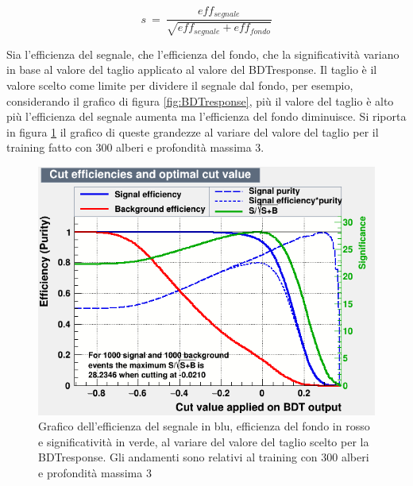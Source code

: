     \begin{equation}
        s \ = \ \frac{eff_{segnale}}{\sqrt{eff_{segnale} + eff_{fondo}}}
    \end{equation}{}

Sia l'efficienza del segnale, che l'efficienza del fondo, che la significatività variano in base al valore del taglio applicato al valore del BDTresponse. Il taglio è il valore scelto come limite per dividere il segnale dal fondo, per esempio, considerando il grafico di figura \ref{fig:BDTresponse}, più il valore del taglio è alto più l'efficienza del segnale aumenta ma l'efficienza del fondo diminuisce. Si riporta in figura \ref{fig:effBDT} il grafico di queste grandezze al variare del valore del taglio per il training fatto con 300 alberi e profondità massima 3.
\\

    \begin{figure}[htbp] 
        \centering
        \includegraphics[width=0.7\linewidth]{training&testing/effBDT.png}
        \caption{Grafico dell'efficienza del segnale in blu, efficienza del fondo in rosso e significatività in verde, al variare del valore del taglio scelto per la BDTresponse. Gli andamenti sono relativi al training con 300 alberi e profondità massima 3}
        \label{fig:effBDT}
    \end{figure}
    
